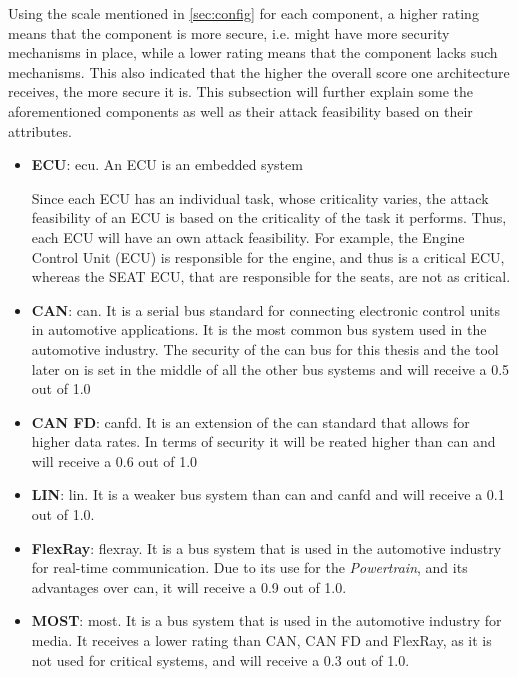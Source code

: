 Using the scale mentioned in \ref{sec:config} for each component, a higher rating means that the component is more secure, i.e. might have more security mechanisms in place,
while a lower rating means that the component lacks such mechanisms.
This also indicated that the higher the overall score one architecture receives, the more secure it is.
This subsection will further explain some the aforementioned components as well as their attack feasibility based on their attributes.

\begin{itemize}
    \item \textbf{ECU}: \gls{ecu}. An ECU is an embedded system  

    Since each ECU has an individual task, whose criticality varies, the attack feasibility of an ECU is based on the criticality of the task it performs.
    Thus, each ECU will have an own attack feasibility. 
    For example, the Engine Control Unit (ECU) is responsible for the engine, and thus is a critical ECU, 
    whereas the SEAT ECU, that are responsible for the seats, are not as critical.
    
    \item \textbf{CAN}: \gls{can}. It is a serial bus standard for connecting electronic control units in automotive applications.
    It is the most common bus system used in the automotive industry. 
    The security of the \gls{can} bus for this thesis and the tool later on is set in the middle of all the other bus systems and will receive a 0.5 out of 1.0

    \item \textbf{CAN FD}: \gls{canfd}. It is an extension of the \gls{can} standard that allows for higher data rates.
    In terms of security it will be reated higher than \gls{can} and will receive a 0.6 out of 1.0
    
    \item \textbf{LIN}: \gls{lin}. It is a weaker bus system than \gls{can} and \gls{canfd} and will receive a 0.1 out of 1.0.
    
    \item \textbf{FlexRay}: \gls{flexray}. It is a bus system that is used in the automotive industry for real-time communication.
    Due to its use for the \textit{Powertrain}, and its advantages over \gls{can}, it will receive a 0.9 out of 1.0.

    \item \textbf{MOST}: \gls{most}. It is a bus system that is used in the automotive industry for media.
    It receives a lower rating than CAN, CAN FD and FlexRay, as it is not used for critical systems, and will receive a 0.3 out of 1.0.


\end{itemize}
